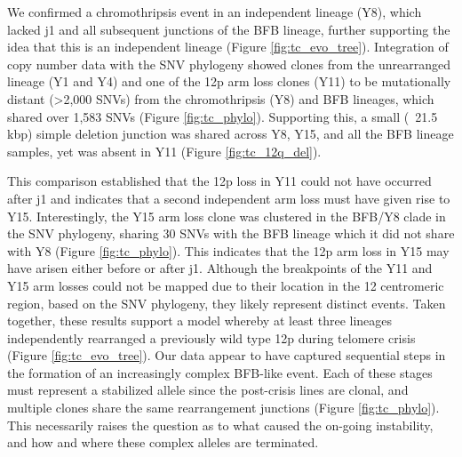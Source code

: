 \documentclass[phd,tocprelim]{cornell}
\begin{document}
We confirmed a chromothripsis event in an independent lineage (Y8), which lacked j1 and all subsequent junctions of the BFB lineage, further supporting the idea that this is an independent lineage (Figure \ref{fig:tc_evo_tree}). Integration of copy number data with the SNV phylogeny showed clones from the unrearranged lineage (Y1 and Y4) and one of the 12p arm loss clones (Y11) to be mutationally distant (>2,000 SNVs) from the chromothripsis (Y8) and BFB lineages, which shared over 1,583 SNVs (Figure \ref{fig:tc_phylo}). Supporting this, a small (~21.5 kbp) simple deletion junction was shared across Y8, Y15, and all the BFB lineage samples, yet was absent in Y11 (Figure \ref{fig:tc_12q_del}).

This comparison established that the 12p loss in Y11 could not have occurred after j1 and indicates that a second independent arm loss must have given rise to Y15. Interestingly, the Y15 arm loss clone was clustered in the BFB/Y8 clade in the SNV phylogeny, sharing 30 SNVs with the BFB lineage which it did not share with Y8 (Figure \ref{fig:tc_phylo}). This indicates that the 12p arm loss in Y15 may have arisen either before or after j1. Although the breakpoints of the Y11 and Y15 arm losses could not be mapped due to their location in the 12 centromeric region, based on the SNV phylogeny, they likely represent distinct events. Taken together, these results support a model whereby at least three lineages independently rearranged a previously wild type 12p during telomere crisis (Figure \ref{fig:tc_evo_tree}). Our data appear to have captured sequential steps in the formation of an increasingly complex BFB-like event. Each of these stages must represent a stabilized allele since the post-crisis lines are clonal, and multiple clones share the same rearrangement junctions (Figure \ref{fig:tc_phylo}). This necessarily raises the question as to what caused the on-going instability, and how and where these complex alleles are terminated.
\end{document}

